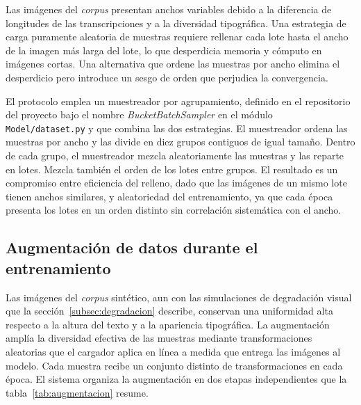 Las imágenes del \textit{corpus} presentan anchos variables debido a la diferencia de longitudes de las transcripciones y a la diversidad tipográfica. Una estrategia de carga puramente aleatoria de muestras requiere rellenar cada lote hasta el ancho de la imagen más larga del lote, lo que desperdicia memoria y cómputo en imágenes cortas. Una alternativa que ordene las muestras por ancho elimina el desperdicio pero introduce un sesgo de orden que perjudica la convergencia.

El protocolo emplea un muestreador por agrupamiento, definido en el repositorio del proyecto bajo el nombre \textit{BucketBatchSampler} en el módulo \texttt{Model/dataset.py}
y que combina las dos estrategias. El muestreador ordena las muestras por ancho y las divide en diez grupos contiguos de igual tamaño. Dentro de cada grupo, el muestreador mezcla aleatoriamente las muestras y las reparte en lotes. Mezcla también el orden de los lotes entre grupos. El resultado es un compromiso entre eficiencia del relleno, dado que las imágenes de un mismo lote tienen anchos similares, y aleatoriedad del entrenamiento, ya que cada época presenta los lotes en un orden distinto sin correlación sistemática con el ancho.

\subsection{Augmentación de datos durante el entrenamiento}
\label{subsec:augmentacion-entrenamiento}

Las imágenes del \textit{corpus} sintético, aun con las simulaciones de degradación visual que la sección~\ref{subsec:degradacion} describe, conservan una uniformidad alta respecto a la altura del texto y a la apariencia tipográfica. La augmentación amplía la diversidad efectiva de las muestras mediante transformaciones aleatorias que el cargador aplica en línea a medida que entrega las imágenes al modelo. Cada muestra recibe un conjunto distinto de transformaciones en cada época. El sistema organiza la augmentación en dos etapas independientes que la tabla~\ref{tab:augmentacion} resume.

